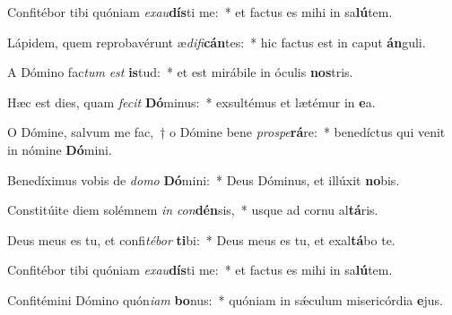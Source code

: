 \item Confitébor tibi quóniam \textit{ex}\textit{au}\textbf{dís}ti me:~* et factus es mihi in sa\textbf{lú}tem.
\item Lápidem, quem reprobavérunt æ\textit{di}\textit{fi}\textbf{cán}tes:~* hic factus est in caput \textbf{án}guli.
\item A Dómino fac\textit{tum} \textit{est} \textbf{is}tud:~* et est mirábile in óculis \textbf{nos}tris.
\item Hæc est dies, quam \textit{fe}\textit{cit} \textbf{Dó}minus:~* exsultémus et lætémur in \textbf{e}a.
\item O Dómine, salvum me fac,~† o Dómine bene \textit{pro}\textit{spe}\textbf{rá}re:~* benedíctus qui venit in nómine \textbf{Dó}mini.
\item Benedíximus vobis de \textit{do}\textit{mo} \textbf{Dó}mini:~* Deus Dóminus, et illúxit \textbf{no}bis.
\item Constitúite diem solémnem \textit{in} \textit{con}\textbf{dén}sis,~* usque ad cornu al\textbf{tá}ris.
\item Deus meus es tu, et confi\textit{té}\textit{bor} \textbf{ti}bi:~* Deus meus es tu, et exal\textbf{tá}bo te.
\item Confitébor tibi quóniam \textit{ex}\textit{au}\textbf{dís}ti me:~* et factus es mihi in sa\textbf{lú}tem.
\item Confitémini Dómino quón\textit{i}\textit{am} \textbf{bo}nus:~* quóniam in sǽculum misericórdia \textbf{e}jus.
